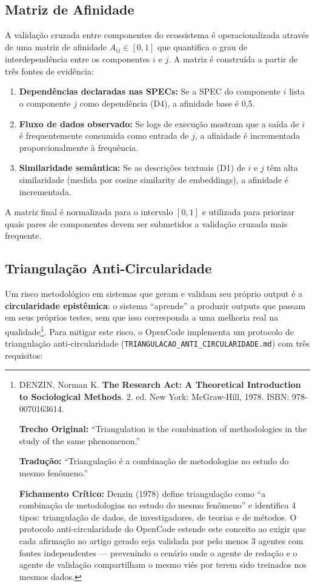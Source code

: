 \subsection{Matriz de Afinidade}

A validação cruzada entre componentes do ecossistema é operacionalizada através de uma matriz de afinidade $A_{ij} \in [0,1]$ que quantifica o grau de interdependência entre os componentes $i$ e $j$. A matriz é construída a partir de três fontes de evidência:

\begin{enumerate}
  \item \textbf{Dependências declaradas nas SPECs:} Se a SPEC do componente $i$ lista o componente $j$ como dependência (D4), a afinidade base é 0,5.
  \item \textbf{Fluxo de dados observado:} Se logs de execução mostram que a saída de $i$ é frequentemente consumida como entrada de $j$, a afinidade é incrementada proporcionalmente à frequência.
  \item \textbf{Similaridade semântica:} Se as descrições textuais (D1) de $i$ e $j$ têm alta similaridade (medida por cosine similarity de embeddings), a afinidade é incrementada.
\end{enumerate}

A matriz final é normalizada para o intervalo $[0,1]$ e utilizada para priorizar quais pares de componentes devem ser submetidos a validação cruzada mais frequente.

\subsection{Triangulação Anti-Circularidade}

Um risco metodológico em sistemas que geram e validam seu próprio output é a \textbf{circularidade epistêmica}: o sistema ``aprende'' a produzir outputs que passam em seus próprios testes, sem que isso corresponda a uma melhoria real na qualidade\footnote{
  DENZIN, Norman K. \textbf{The Research Act: A Theoretical Introduction to Sociological Methods}. 2. ed. New York: McGraw-Hill, 1978. ISBN: 978-0070163614.

  \textbf{Trecho Original:} ``Triangulation is the combination of methodologies in the study of the same phenomenon.''

  \textbf{Tradução:} ``Triangulação é a combinação de metodologias no estudo do mesmo fenômeno.''

  \textbf{Fichamento Crítico:} Denzin (1978) define triangulação como ``a combinação de metodologias no estudo do mesmo fenômeno'' e identifica 4 tipos: triangulação de dados, de investigadores, de teorias e de métodos. O protocolo anti-circularidade do OpenCode estende este conceito ao exigir que cada afirmação no artigo gerado seja validada por pelo menos 3 agentes com fontes independentes --- prevenindo o cenário onde o agente de redação e o agente de validação compartilham o mesmo viés por terem sido treinados nos mesmos dados.
}. Para mitigar este risco, o OpenCode implementa um protocolo de triangulação anti-circularidade (\texttt{TRIANGULACAO\-\_ANTI\-\_CIRCULARIDADE.md}) com três requisitos:

